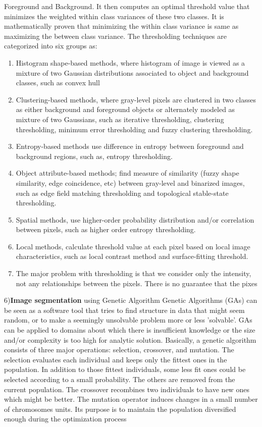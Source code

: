 \documentclass{article}
\begin{document}
Foreground and Background. It then computes an optimal
threshold value that minimizes the weighted within class
variances of these two classes. It is mathematically proven
that minimizing the within class variance is same as
maximizing the between class variance.
The thresholding techniques are categorized into
six groups as:\\
\begin{enumerate}
\item Histogram shape-based methods, where
histogram of image is viewed as a mixture of two
Gaussian distributions associated to object and
background classes, such as convex hull
\item Clustering-based methods, where gray-level
pixels are clustered in two classes as either
background and foreground objects or alternately
modeled as mixture of two Gaussians, such as
iterative thresholding, clustering thresholding,
minimum error thresholding and fuzzy clustering
thresholding.
\item Entropy-based methods use difference in entropy
between foreground and background regions,
such as, entropy thresholding.
\item Object attribute-based methods; find measure of
similarity (fuzzy shape similarity, edge
coincidence, etc) between gray-level and
binarized images, such as edge field matching
thresholding and topological stable-state
thresholding.
\item Spatial methods, use higher-order probability
distribution and/or correlation between pixels,
such as higher order entropy thresholding.
\item Local methods, calculate threshold value at each
pixel based on local image characteristics, such
as local contrast method and surface-fitting
threshold.
\item The major problem with thresholding is that we
consider only the intensity, not any relationships between
the pixels. There is no guarantee that the pixes
\end{enumerate}
6)\textbf{Image segmentation} using Genetic Algorithm
Genetic Algorithms (GAs) can be seen as a
software tool that tries to find structure in data that might
seem random, or to make a seemingly unsolvable problem
more or less 'solvable'. GAs can be applied to domains
about which there is insufficient knowledge or the size
and/or complexity is too high for analytic solution.
 Basically, a genetic algorithm consists
of three major operations: selection, crossover, and
mutation. The selection evaluates each individual and
keeps only the fittest ones in the population. In addition to
those fittest individuals, some less fit ones could be
selected according to a small probability. The others are
removed from the current population. The crossover
recombines two individuals to have new ones which might
be better. The mutation operator induces changes in a
small number of chromosomes units. Its purpose is to
maintain the population diversified enough during the
optimization process







\end{document}
